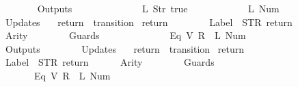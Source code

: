 \begin{isabellebody}
\ \ \ \ \ \ {\isacharbrackright}{\isacharcomma}\isanewline
\ \ \ \ \ \ Outputs\ {\isacharequal}\ {\isacharbrackleft}\isanewline
\ \ \ \ \ \ \ \ \ \ \ \ {\isacharparenleft}L\ {\isacharparenleft}Str\ {\isacharprime}{\isacharprime}true{\isacharprime}{\isacharprime}{\isacharparenright}{\isacharparenright}{\isacharcomma}\isanewline
\ \ \ \ \ \ \ \ \ \ \ \ {\isacharparenleft}L\ {\isacharparenleft}Num\ {}{\isacharparenright}{\isacharparenright}\isanewline
\ \ \ \ \ \ {\isacharbrackright}{\isacharcomma}\isanewline
\ \ \ \ \ \ Updates\ {\isacharequal}\ {\isacharbrackleft}{\isacharbrackright}\isanewline
{\isasymrparr}{\isachardoublequoteclose}\isanewline
\isanewline
{}\isamarkupfalse%
\ {\isachardoublequoteopen}return{}{\isachardoublequoteclose}\ {\isacharcolon}{\isacharcolon}\ {\isachardoublequoteopen}transition{\isachardoublequoteclose}\ \isanewline
{\isachardoublequoteopen}return{}\ {\isasymequiv}\ {\isasymlparr}\isanewline
\ \ \ \ \ \ Label\ {\isacharequal}\ STR\ {\isacharprime}{\isacharprime}return{\isacharprime}{\isacharprime}{\isacharcomma}\isanewline
\ \ \ \ \ \ Arity\ {\isacharequal}\ {}{\isacharcomma}\isanewline
\ \ \ \ \ \ Guards\ {\isacharequal}\ {\isacharbrackleft}\isanewline
\ \ \ \ \ \ \ \ \ \ \ \ {\isacharparenleft}Eq\ {\isacharparenleft}V\ {\isacharparenleft}R\ {}{\isacharparenright}{\isacharparenright}\ {\isacharparenleft}L\ {\isacharparenleft}Num\ {}{\isacharparenright}{\isacharparenright}{\isacharparenright}\isanewline
\ \ \ \ \ \ {\isacharbrackright}{\isacharcomma}\isanewline
\ \ \ \ \ \ Outputs\ {\isacharequal}\ {\isacharbrackleft}{\isacharbrackright}{\isacharcomma}\isanewline
\ \ \ \ \ \ Updates\ {\isacharequal}\ {\isacharbrackleft}{\isacharbrackright}\isanewline
{\isasymrparr}{\isachardoublequoteclose}\isanewline
\isanewline
{}\isamarkupfalse%
\ {\isachardoublequoteopen}return{}{\isachardoublequoteclose}\ {\isacharcolon}{\isacharcolon}\ {\isachardoublequoteopen}transition{\isachardoublequoteclose}\ \isanewline
{\isachardoublequoteopen}return{}\ {\isasymequiv}\ {\isasymlparr}\isanewline
\ \ \ \ \ \ Label\ {\isacharequal}\ STR\ {\isacharprime}{\isacharprime}return{\isacharprime}{\isacharprime}{\isacharcomma}\isanewline
\ \ \ \ \ \ Arity\ {\isacharequal}\ {}{\isacharcomma}\isanewline
\ \ \ \ \ \ Guards\ {\isacharequal}\ {\isacharbrackleft}\isanewline
\ \ \ \ \ \ \ \ \ \ \ \ {\isacharparenleft}Eq\ {\isacharparenleft}V\ {\isacharparenleft}R\ {}{\isacharparenright}{\isacharparenright}\ {\isacharparenleft}L\ {\isacharparenleft}Num\ {}{\isacharparenright}{\isacharparenright}{\isacharparenright}\isanewline

\end{isabellebody}
